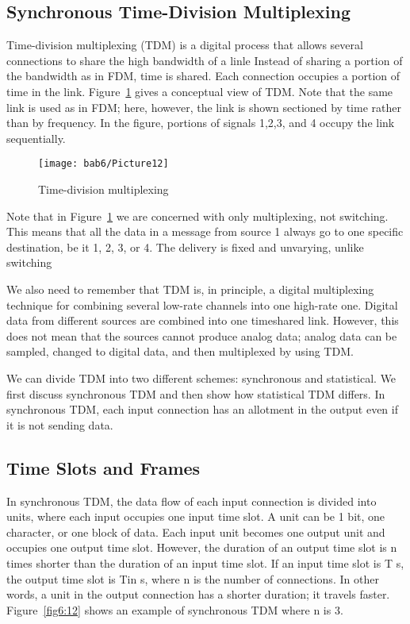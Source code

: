 \subsection{Synchronous Time-Division Multiplexing}
Time-division multiplexing (TDM) is a digital process that allows several connections to share the high bandwidth of a linle Instead of sharing a portion of the bandwidth as in FDM, time is shared. Each connection occupies a portion of time in the link. Figure~\ref{fig6:11} gives a conceptual view of TDM. Note that the same link is used as in FDM; here, however, the link is shown sectioned by time rather than by frequency. In the figure, portions of signals 1,2,3, and 4 occupy the link sequentially.

\begin{figure}[htbp]
  \centering
  \texttt{[image: bab6/Picture12]}
  \caption{Time-division multiplexing}
  \label{fig6:11}
\end{figure}

Note that in Figure~\ref{fig6:11} we are concerned with only multiplexing, not switching. This means that all the data in a message from source 1 always go to one specific destination, be it 1, 2, 3, or 4. The delivery is fixed and unvarying, unlike switching

We also need to remember that TDM is, in principle, a digital multiplexing technique for combining several low-rate channels into one high-rate one. Digital data from different sources are combined into one timeshared link. However, this does not mean that the sources cannot produce analog data; analog data can be sampled, changed to digital data, and then multiplexed by using TDM.

We can divide TDM into two different schemes: synchronous and statistical. We first discuss synchronous TDM and then show how statistical TDM differs. In synchronous TDM, each input connection has an allotment in the output even if it is not sending data.

\subsection*{Time Slots and Frames}
In synchronous TDM, the data flow of each input connection is divided into units, where each input occupies one input time slot. A unit can be 1 bit, one character, or one block of data. Each input unit becomes one output unit and occupies one output time slot. However, the duration of an output time slot is n times shorter than the duration of an input time slot. If an input time slot is T s, the output time slot is Tin s, where n is the number of connections. In other words, a unit in the output connection has a shorter duration; it travels faster. Figure~\ref{fig6:12} shows an example of synchronous TDM where n is 3.

